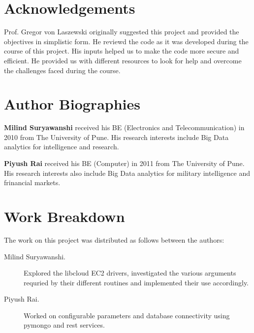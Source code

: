 \documentclass[9pt,twocolumn,twoside]{../../styles/osajnl}
\begin{document}
\section*{Acknowledgements}

Prof. Gregor von Laszewski originally suggested this project and provided the objectives in simplistic form. He reviewd the code as it was developed during the course of this project. His inputs helped us to make the code more secure and efficient. He provided us with different resources to look for help and overcome the challenges faced during the course.



 
\section*{Author Biographies}
\begingroup
\setlength\intextsep{0pt}
\begin{minipage}{1.0\columnwidth}
  \noindent
  {\bfseries Milind Suryawanshi} received his BE (Electronics and Telecommunication) in 2010 from
  The University of Pune. His research interests include Big Data analytics for intelligence and research. 
\end{minipage}
\begin{minipage}{1.0\columnwidth} 
  \noindent
  {\bfseries Piyush Rai} received his BE (Computer) in 2011 from
  The University of Pune. His research interests also include Big Data analytics for military intelligence and frinancial markets. 
\end{minipage}

\endgroup

\newpage

\appendix

\section{Work Breakdown}

The work on this project was distributed as follows between the
authors:

\begin{description}

\item[Milind Suryawanshi.] Explored the libcloud EC2 drivers, investigated the various arguments requried by their different routines and implemented their use accordingly.

\item[Piyush Rai.] Worked on configurable parameters and database connectivity using pymongo and rest services.

\end{description}
\end{document}
